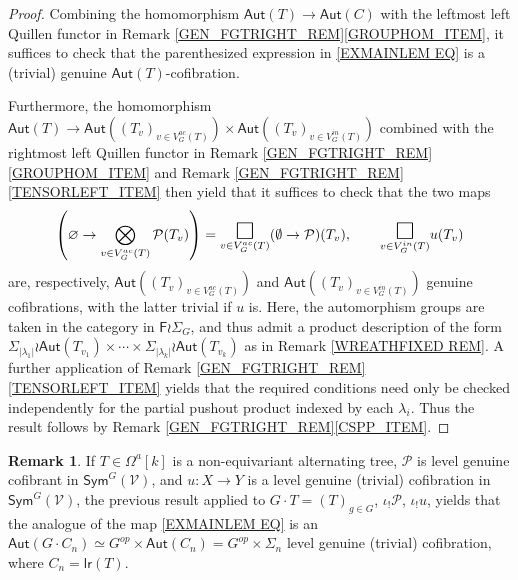\documentclass[a4paper,10pt
,draft
]{article}%
\numberwithin{equation}{section}
\numberwithin{figure}{section}
\theoremstyle{definition} %
\newtheorem{remark}[equation]{Remark}%
\newcommand{\Fin}{\mathsf{F}}%
\newcommand{\V}{\ensuremath{\mathcal V}}
\renewcommand{\P}{\ensuremath{\mathcal P}}
\newcommand{\1}{\ensuremath{\mathbbm 1}}%
\begin{document}
\begin{proof}
	Combining the homomorphism $\mathsf{Aut}(T) \to \mathsf{Aut}(C)$ with the leftmost left Quillen functor in 
	Remark \ref{GEN_FGTRIGHT_REM}\ref{GROUPHOM_ITEM},
	it suffices to check that the parenthesized 
	expression in \eqref{EXMAINLEM EQ}
	is a (trivial) genuine 
	$\mathsf{Aut}(T)$-cofibration.

	Furthermore, the homomorphism
	$\mathsf{Aut}(T) \to 
	\mathsf{Aut}\left( (T_v)_{v \in V_G^{ac}(T)}\right) \times 
	\mathsf{Aut}\left( (T_v)_{v \in V_G^{in}(T)}\right)$
	combined with the rightmost left Quillen functor in Remark \ref{GEN_FGTRIGHT_REM}\ref{GROUPHOM_ITEM} and Remark \ref{GEN_FGTRIGHT_REM}\ref{TENSORLEFT_ITEM}
	then yield that it suffices to check that the two maps
\[
\left( \varnothing \to \bigotimes\limits_{v \in V_{G}^{ac}(T)}\P(T_v) \right)
=
\underset{v \in V_{G}^{ac}(T)}{\mathlarger{\mathlarger{\mathlarger{\square}}}}
(\emptyset \to \P)(T_v),
	\qquad
\underset{v \in V_{G}^{in}(T)}{\mathlarger{\mathlarger{\mathlarger{\square}}}}
u(T_v)
\]
are, respectively, 
$\mathsf{Aut}\left( (T_v)_{v \in V_G^{ac}(T)}\right)$ and 
$\mathsf{Aut}\left( (T_v)_{v \in V_G^{in}(T)}\right)$
genuine cofibrations, with the latter trivial if $u$ is. Here, the automorphism groups are taken in the category in $\Fin \wr \Sigma_G$,
and thus admit a product description of the form
$
	\Sigma_{|\lambda_1|} \wr 
	\mathsf{Aut}(T_{v_1})
		\times \cdots \times	
	\Sigma_{|\lambda_k|} \wr 
	\mathsf{Aut}(T_{v_k})
$
as in Remark \ref{WREATHFIXED REM}.
A further application of Remark \ref{GEN_FGTRIGHT_REM}\ref{TENSORLEFT_ITEM}
yields that the required conditions need only be checked independently for the
partial pushout product indexed by each $\lambda_i$.
Thus the result follows by Remark \ref{GEN_FGTRIGHT_REM}\ref{CSPP_ITEM}.
\end{proof}



\begin{remark}\label{EXMAINLEM REM}
If %
$T \in \Omega^a[k]$ is a non-equivariant alternating tree, 
$\mathcal{P}$ is level genuine cofibrant in $\mathsf{Sym}^G(\V)$,
and
$u \colon X \to Y$ is a level genuine (trivial) cofibration in $\mathsf{Sym}^G(\V)$,
the previous result applied to
$G \cdot T = (T)_{g \in G}$,
$\iota_{!} \mathcal{P}$,
$\iota_{!} u$,
yields that the analogue of the map
\eqref{EXMAINLEM EQ}
is an $\mathsf{Aut}(G \cdot C_n) 
\simeq G^{op} \times \mathsf{Aut}(C_n) =
G^{op} \times \Sigma_n$ level genuine (trivial) cofibration,
where $C_n = \mathsf{lr}(T)$.
\end{remark}
\end{document}
